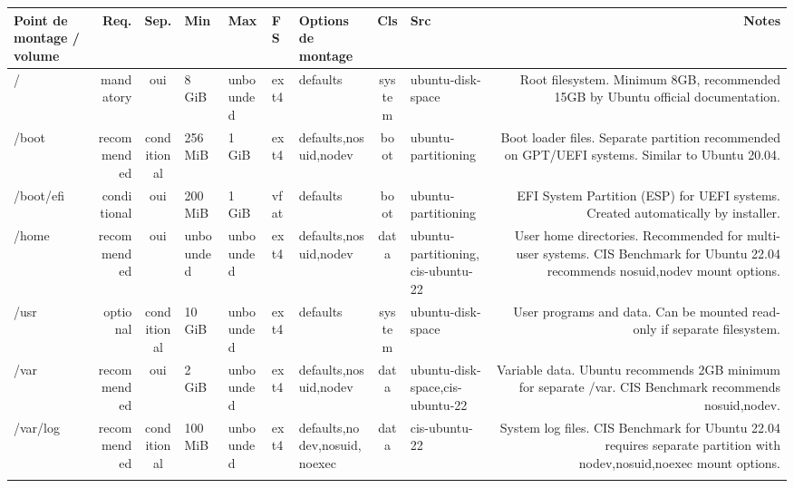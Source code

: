 \documentclass[10pt,a4paper]{article}
\renewcommand{\arraystretch}{1.2}
\begin{document}
{\renewcommand{\arraystretch}{1.15}\begin{longtable}{M R S Z Z T O C I N}\toprule\textbf{\normalfont\scriptsize Point de montage / volume} & \textbf{\normalfont\scriptsize Req.} & \textbf{\normalfont\scriptsize Sep.} & \textbf{\normalfont\scriptsize Min} & \textbf{\normalfont\scriptsize Max} & \textbf{\normalfont\scriptsize FS} & \textbf{\normalfont\scriptsize Options de montage} & \textbf{\normalfont\scriptsize Cls} & \textbf{\normalfont\scriptsize Src} & \textbf{\normalfont\scriptsize Notes}\\\midrule\endhead
/ & \textcolor{cBlock}{mandatory} & \textcolor{cOk}{oui} & 8 GiB & unbounded & ext4 & defaults & system & ubuntu-disk-space & Root filesystem. Minimum 8GB, recommended 15GB by Ubuntu official documentation.\\
/boot & \textcolor{cHigh}{recommended} & conditional & 256 MiB & 1 GiB & ext4 & defaults,nosuid,nodev & boot & ubuntu-partitioning & Boot loader files. Separate partition recommended on GPT/UEFI systems. Similar to Ubuntu 20.04.\\
/boot/efi & \textcolor{cMed}{conditional} & \textcolor{cOk}{oui} & 200 MiB & 1 GiB & vfat & defaults & boot & ubuntu-partitioning & EFI System Partition (ESP) for UEFI systems. Created automatically by installer.\\
/home & \textcolor{cHigh}{recommended} & \textcolor{cOk}{oui} & unbounded & unbounded & ext4 & defaults,nosuid,nodev & data & ubuntu-partitioning,cis-ubuntu-22 & User home directories. Recommended for multi-user systems. CIS Benchmark for Ubuntu 22.04 recommends nosuid,nodev mount options.\\
/usr & \textcolor{cLow}{optional} & conditional & 10 GiB & unbounded & ext4 & defaults & system & ubuntu-disk-space & User programs and data. Can be mounted read-only if separate filesystem.\\
/var & \textcolor{cHigh}{recommended} & \textcolor{cOk}{oui} & 2 GiB & unbounded & ext4 & defaults,nosuid,nodev & data & ubuntu-disk-space,cis-ubuntu-22 & Variable data. Ubuntu recommends 2GB minimum for separate /var. CIS Benchmark recommends nosuid,nodev.\\
/var/log & \textcolor{cHigh}{recommended} & conditional & 100 MiB & unbounded & ext4 & defaults,nodev,nosuid,noexec & data & cis-ubuntu-22 & System log files. CIS Benchmark for Ubuntu 22.04 requires separate partition with nodev,nosuid,noexec mount options.\\

\end{longtable}}
\end{document}

